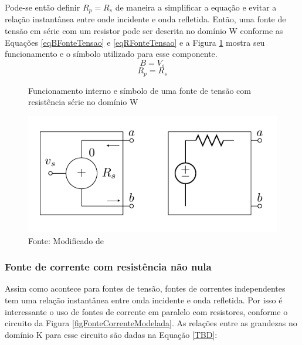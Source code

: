 	Pode-se então definir $R_p = R_s$ de maneira a simplificar a equação e evitar a relação instantânea entre onde incidente e onda refletida. Então, uma fonte de tensão em série com um resistor pode ser descrita no domínio W conforme as Equações \ref{eqBFonteTensao} e \ref{eqRFonteTensao} e a Figura \ref{figFonteTensaoDominioW} mostra seu funcionamento e o símbolo utilizado para esse componente.
	\begin{equation}
		\label{eqBFonteTensao}
		B = V_s
	\end{equation}
	\begin{equation}
		\label{eqRFonteTensao}
		R_p = R_s
	\end{equation}
	
	\begin{figure}[h]
		\label{figFonteTensaoDominioW}
		\caption{Funcionamento interno e símbolo de uma fonte de tensão com resistência série no domínio W}
		\includegraphics[scale=0.5]{images/fonteTensaoDominioW}
		\centering
		\caption*{Fonte: Modificado de \cite{Bogason2017}}
	\end{figure}
	
		\subsubsection{Fonte de corrente com resistência não nula}
	
	Assim como acontece para fontes de tensão, fontes de correntes independentes tem uma relação instantânea entre onda incidente e onda refletida. Por isso é interessante o uso de fontes de corrente em paralelo com resistores, conforme o circuito da Figura \ref{figFonteCorrenteModelada}. As relações entre as grandezas no domínio K para esse circuito são dadas na Equação \ref{TBD}:
	
